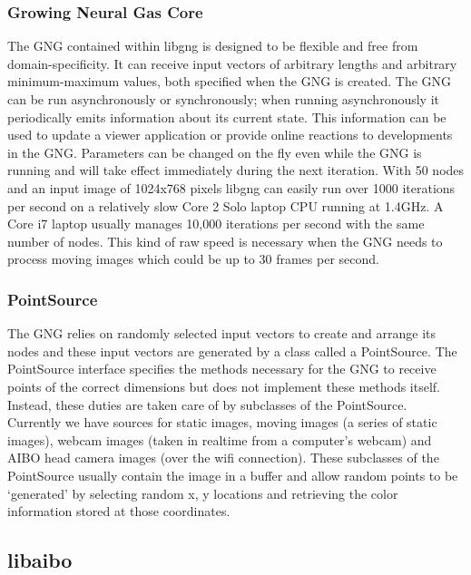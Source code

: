 \documentclass{article}
\renewcommand{\|}{\origbar} %
\begin{document}
\subsubsection{Growing Neural Gas Core}

The GNG contained within libgng is designed to be flexible and free from domain-specificity. It can receive input vectors of arbitrary lengths and arbitrary minimum-maximum values, both specified when the GNG is created. The GNG can be run asynchronously or synchronously; when running asynchronously it periodically emits information about its current state. This information can be used to update a viewer application or provide online reactions to developments in the GNG. Parameters can be changed on the fly even while the GNG is running and will take effect immediately during the next iteration. With 50 nodes and an input image of 1024x768 pixels libgng can easily run over 1000 iterations per second on a relatively slow Core 2 Solo laptop CPU running at 1.4GHz. A Core i7 laptop usually manages 10,000 iterations per second with the same number of nodes. This kind of raw speed is necessary when the GNG needs to process moving images which could be up to 30 frames per second.

\subsubsection{PointSource}

The GNG relies on randomly selected input vectors to create and arrange its nodes and these input vectors are generated by a class called a PointSource. The PointSource interface specifies the methods necessary for the GNG to receive points of the correct dimensions but does not implement these methods itself. Instead, these duties are taken care of by subclasses of the PointSource. Currently we have sources for static images, moving images (a series of static images), webcam images (taken in realtime from a computer's webcam) and AIBO head camera images (over the wifi connection). These subclasses of the PointSource usually contain the image in a buffer and allow random points to be `generated' by selecting random x, y locations and retrieving the color information stored at those coordinates.

\subsection{libaibo}
\end{document}
